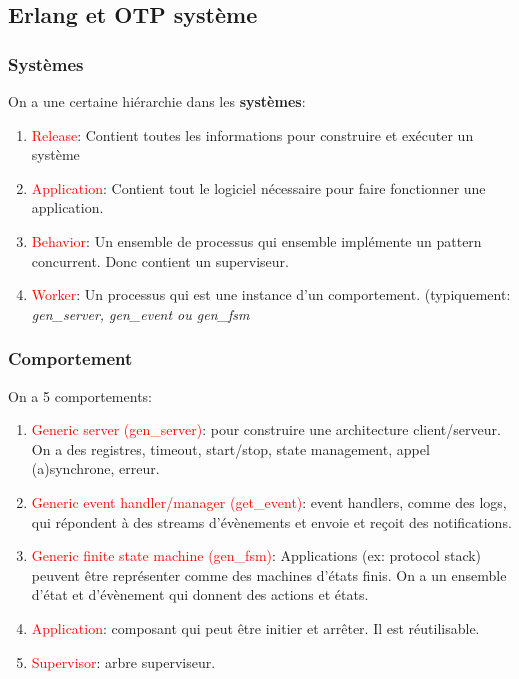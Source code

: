 \documentclass{report}
\begin{document}
\subsection{Erlang et OTP système}

\subsubsection{Systèmes}
On a une certaine hiérarchie dans les \textbf{systèmes}:
\begin{enumerate}
\item \textcolor{red}{Release}: Contient toutes les informations pour construire et exécuter un système
\item \textcolor{red}{Application}: Contient tout le logiciel nécessaire pour faire fonctionner une application. 
\item \textcolor{red}{Behavior}: Un ensemble de processus qui ensemble implémente un pattern concurrent. Donc contient un superviseur.
\item \textcolor{red}{Worker}: Un processus qui est une instance d'un comportement. (typiquement: \textit{gen\_server, gen\_event ou gen\_fsm}
\end{enumerate}

\subsubsection{Comportement}
On a 5 comportements:
\begin{enumerate}
\item \textcolor{red}{Generic server (gen\_server)}: pour construire une architecture client/serveur. On a des registres, timeout, start/stop, state management, appel (a)synchrone, erreur.
\item \textcolor{red}{Generic event handler/manager (get\_event)}: event handlers, comme des logs, qui répondent à des streams d'évènements et envoie et reçoit des notifications.
\item \textcolor{red}{Generic finite state machine (gen\_fsm)}: Applications (ex: protocol stack) peuvent être représenter comme des machines d'états finis. On a un ensemble d'état et d'évènement qui donnent des actions et états.
\item \textcolor{red}{Application}: composant qui peut être initier et arrêter. Il est réutilisable.
\item \textcolor{red}{Supervisor}: arbre superviseur.
\end{enumerate}
\end{document}
